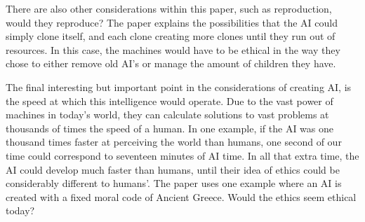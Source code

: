 \documentclass[article]{IEEEtran}
\begin{document}
There are also other considerations within this paper, such as reproduction, would they reproduce? The paper explains the possibilities that the AI could simply clone itself, and each clone creating more clones until they run out of resources. In this case, the machines would have to be ethical in the way they chose to either remove old AI’s or manage the amount of children they have.\par
The final interesting but important point in the considerations of creating AI, is the speed at which this intelligence would operate. Due to the vast power of machines in today’s world, they can calculate solutions to vast problems at thousands of times the speed of a human. In one example, if the AI was one thousand times faster at perceiving the world than humans, one second of our time could correspond to seventeen minutes of AI time. In all that extra time, the AI could develop much faster than humans, until their idea of ethics could be considerably different to humans’. The paper uses one example where an AI is created with a fixed moral code of Ancient Greece. Would the ethics seem ethical today?  
\end{document}
